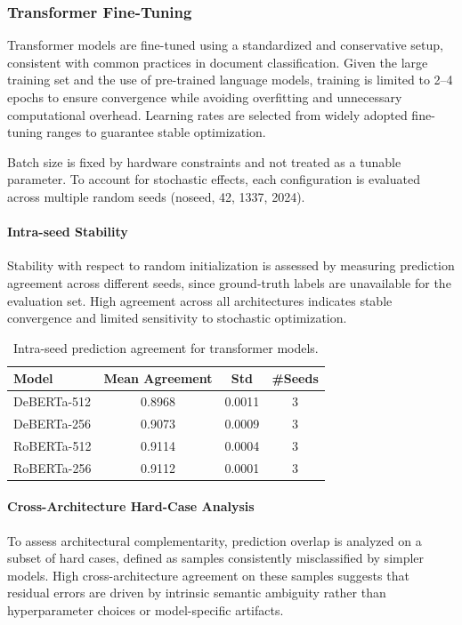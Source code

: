 \subsubsection{Transformer Fine-Tuning}

Transformer models are fine-tuned using a standardized and conservative
setup, consistent with common practices in document classification.
Given the large training set and the use of pre-trained language models,
training is limited to 2--4 epochs to ensure convergence while avoiding
overfitting and unnecessary computational overhead.
Learning rates are selected from widely adopted fine-tuning ranges to
guarantee stable optimization.

Batch size is fixed by hardware constraints and not treated as a tunable
parameter. To account for stochastic effects, each configuration is
evaluated across multiple random seeds (noseed, 42, 1337, 2024).

\paragraph{Intra-seed Stability}
Stability with respect to random initialization is assessed by measuring
prediction agreement across different seeds, since ground-truth labels
are unavailable for the evaluation set.
High agreement across all architectures indicates stable convergence and
limited sensitivity to stochastic optimization.

\begin{table}[h]
\centering
\caption{Intra-seed prediction agreement for transformer models.}
\label{tab:intra_seed_agreement}
\small
\begin{tabular}{lccc}
\hline
\textbf{Model} & \textbf{Mean Agreement} & \textbf{Std} & \textbf{\#Seeds} \\
\hline
DeBERTa-512  & 0.8968 & 0.0011 & 3 \\
DeBERTa-256  & 0.9073 & 0.0009 & 3 \\
RoBERTa-512  & 0.9114 & 0.0004 & 3 \\
RoBERTa-256  & 0.9112 & 0.0001 & 3 \\
\hline
\end{tabular}
\end{table}

\paragraph{Cross-Architecture Hard-Case Analysis}
To assess architectural complementarity, prediction overlap is analyzed
on a subset of hard cases, defined as samples consistently misclassified
by simpler models.
High cross-architecture agreement on these samples suggests that residual
errors are driven by intrinsic semantic ambiguity rather than
hyperparameter choices or model-specific artifacts.

